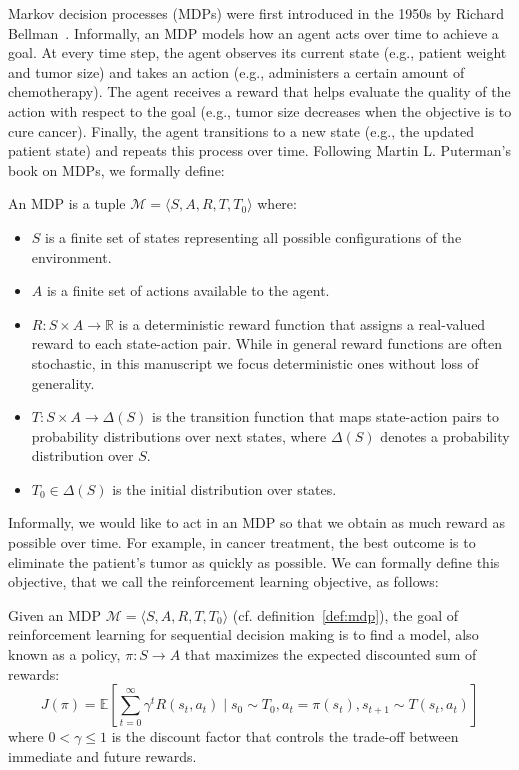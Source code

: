 Markov decision processes (MDPs) were first introduced in the 1950s by Richard Bellman~\cite{Bellman}.
Informally, an MDP models how an agent acts over time to achieve a goal. 
At every time step, the agent observes its current state (e.g., patient weight and tumor size) and takes an action (e.g., administers a certain amount of chemotherapy).
The agent receives a reward that helps evaluate the quality of the action with respect to the goal (e.g., tumor size decreases when the objective is to cure cancer).
Finally, the agent transitions to a new state (e.g., the updated patient state) and repeats this process over time. 
Following Martin L. Puterman's book on MDPs\cite{puterman}, we formally define:
\begin{definition}\label{def:mdp} An MDP is a tuple $\mathcal{M} = \langle S, A, R, T, T_0 \rangle$ where:
\begin{itemize}
\item $S$ is a finite set of states representing all possible configurations of the environment.
\item $A$ is a finite set of actions available to the agent.
\item $R: S \times A \rightarrow \mathbb{R}$ is a deterministic reward function that assigns a real-valued reward to each state-action pair. While in general reward functions are often stochastic, in this manuscript we focus deterministic ones without loss of generality.
\item $T: S \times A \rightarrow \Delta(S)$ is the transition function that maps state-action pairs to probability distributions over next states, where $\Delta(S)$ denotes a probability distribution over $S$.
\item $T_0 \in \Delta(S)$ is the initial distribution over states.
\end{itemize}
\end{definition}

Informally, we would like to act in an MDP so that we obtain as much reward as possible over time.
For example, in cancer treatment, the best outcome is to eliminate the patient's tumor as quickly as possible.
We can formally define this objective, that we call the reinforcement learning objective, as follows:

\begin{definition}\label{def:mdp-obj} Given an MDP $\mathcal{M}=\langle S, A, R, T, T_0 \rangle$ (cf. definition~\ref{def:mdp}), the goal of reinforcement learning for sequential decision making is to find a model, also known as a policy, $\pi: S \rightarrow A$ that maximizes the expected discounted sum of rewards:
$$J(\pi) = \mathbb{E}\left[\sum_{t=0}^{\infty} \gamma^t R(s_t, a_t) \mid s_0 \sim T_0, a_t = \pi(s_t), s_{t+1} \sim T(s_t, a_t)\right]$$
where $0< \gamma\leq 1$ is the discount factor that controls the trade-off between immediate and future rewards.
\end{definition}

